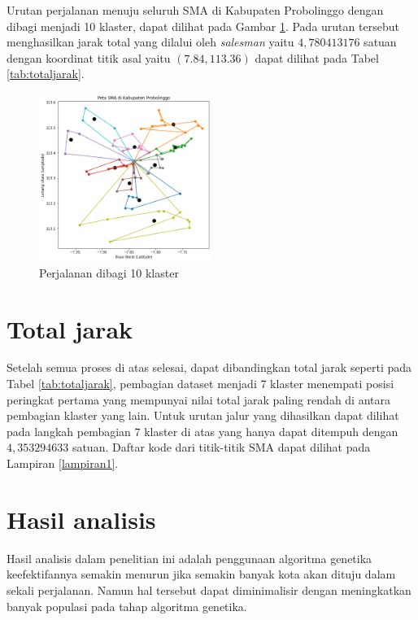 Urutan perjalanan menuju seluruh SMA di Kabupaten Probolinggo dengan dibagi menjadi 10 klaster, dapat dilihat pada Gambar \ref{fig:hasil_mtsp10}. Pada urutan tersebut menghasilkan jarak total yang dilalui oleh \textit{salesman} yaitu $4,780413176$ satuan dengan koordinat titik asal yaitu $(7.84, 113.36)$ dapat dilihat pada Tabel \ref{tab:totaljarak}.

\begin{figure}[H]
\centering
\includegraphics[width=0.5\textwidth]{Gambar/hasil_mtsp/10}
\caption{Perjalanan dibagi 10 klaster}
\label{fig:hasil_mtsp10}
\end{figure}

\section{Total jarak}
Setelah semua proses di atas selesai, dapat dibandingkan total jarak seperti pada Tabel \ref{tab:totaljarak}, pembagian dataset  menjadi 7 klaster menempati posisi peringkat pertama yang mempunyai nilai total jarak paling rendah di antara pembagian klaster yang lain. Untuk urutan jalur yang dihasilkan dapat dilihat pada langkah pembagian 7 klaster di atas yang hanya dapat ditempuh dengan $4,353294633$ satuan. Daftar kode dari titik-titik SMA dapat dilihat pada Lampiran \ref{lampiran1}.



\section{Hasil analisis}

Hasil analisis dalam penelitian ini adalah penggunaan algoritma genetika keefektifannya semakin menurun jika semakin banyak kota akan dituju dalam sekali perjalanan. Namun hal tersebut dapat diminimalisir dengan meningkatkan banyak populasi pada tahap algoritma genetika.